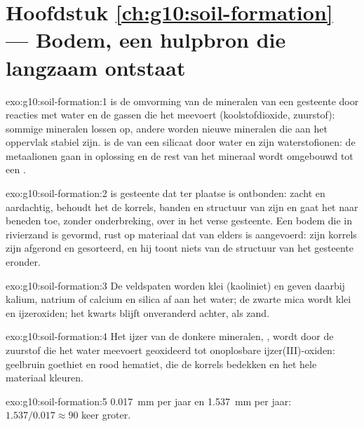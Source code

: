 \section*{Hoofdstuk \ref{ch:g10:soil-formation} --- Bodem, een hulpbron die langzaam ontstaat}

\begin{solution}{exo:g10:soil-formation:1}
 is de omvorming van de mineralen van een gesteente door
reacties met water en de gassen die het meevoert (koolstofdioxide, zuurstof):
sommige mineralen lossen op, andere worden nieuwe mineralen die aan het oppervlak
stabiel zijn.  is de  van een silicaat door water en
zijn waterstofionen: de metaalionen gaan in oplossing en de rest van het mineraal
wordt omgebouwd tot een .
\end{solution}

\begin{solution}{exo:g10:soil-formation:2}
 is gesteente dat ter plaatse is ontbonden: zacht en aardachtig, behoudt
het de korrels, banden en structuur van zijn  en gaat het naar
beneden toe, zonder onderbreking, over in het verse gesteente. Een bodem die in
rivierzand is gevormd, rust op materiaal dat van elders is aangevoerd: zijn
korrels zijn afgerond en gesorteerd, en hij toont niets van de structuur van het
gesteente eronder.
\end{solution}

\begin{solution}{exo:g10:soil-formation:3}
De veldspaten worden klei (kaoliniet) en geven daarbij kalium, natrium of
calcium en silica af aan het water; de zwarte mica wordt klei en ijzeroxiden;
het kwarts blijft onveranderd achter, als zand.
\end{solution}

\begin{solution}{exo:g10:soil-formation:4}
Het ijzer van de donkere mineralen, , wordt door de zuurstof die het
water meevoert geoxideerd tot onoplosbare ijzer(III)-oxiden: geelbruin goethiet
en rood hematiet, die de korrels bedekken en het hele materiaal kleuren.
\end{solution}

\begin{solution}{exo:g10:soil-formation:5}
\qty{0.017}{mm} per jaar en \qty{1.537}{mm} per jaar: $1.537/0.017 \approx 90$
keer groter.
\end{solution}

